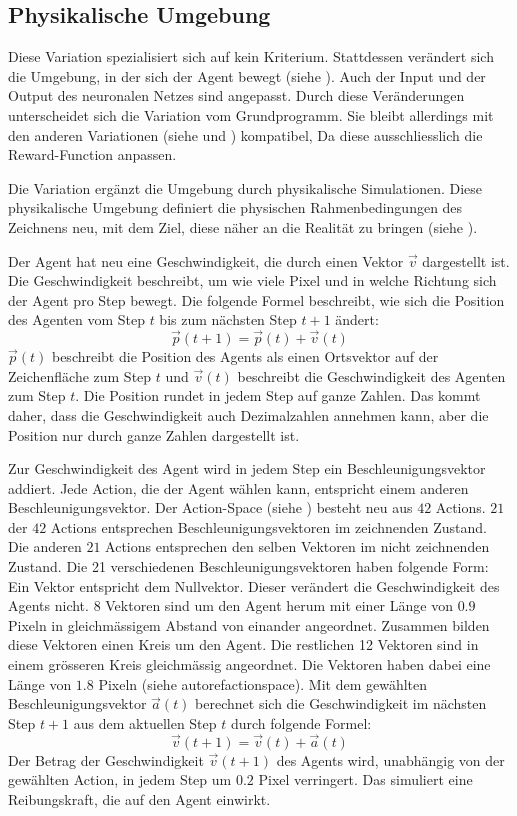 \subsection{Physikalische Umgebung}\label{sub:m_var_phy}
Diese Variation spezialisiert sich auf kein Kriterium. Stattdessen verändert
sich die Umgebung, in der sich der Agent bewegt (siehe ).
Auch der Input und der Output des neuronalen Netzes sind angepasst. Durch diese
Veränderungen unterscheidet sich die Variation vom Grundprogramm. Sie bleibt
allerdings mit den anderen Variationen (siehe  und
) kompatibel, Da diese ausschliesslich die
Reward-Function anpassen.

Die Variation ergänzt die Umgebung durch physikalische Simulationen. Diese
physikalische Umgebung definiert die physischen Rahmenbedingungen des Zeichnens
neu, mit dem Ziel, diese näher an die Realität zu bringen (siehe
). 

Der Agent hat neu eine Geschwindigkeit, die durch einen Vektor $\vec{v}$
dargestellt ist. Die Geschwindigkeit beschreibt, um wie viele Pixel und in
welche Richtung sich der Agent pro Step bewegt. Die folgende Formel beschreibt,
wie sich die Position des Agenten vom Step $t$ bis zum nächsten Step $t+1$
ändert:
\[ \vec{p}(t+1) = \vec{p}(t) + \vec{v}(t) \] 
$\vec{p}(t)$ beschreibt die Position des Agents als einen Ortsvektor auf der
Zeichenfläche zum Step $t$ und $\vec{v}(t)$ beschreibt die Geschwindigkeit des
Agenten zum Step $t$. Die Position rundet in jedem Step auf ganze Zahlen. Das
kommt daher, dass die Geschwindigkeit auch Dezimalzahlen annehmen kann, aber die
Position nur durch ganze Zahlen dargestellt ist.

Zur Geschwindigkeit des Agent wird in jedem Step ein Beschleunigungsvektor
addiert. Jede Action, die der Agent wählen kann, entspricht einem anderen
Beschleunigungsvektor. Der Action-Space (siehe ) besteht
neu aus $42$ Actions. $21$ der $42$ Actions entsprechen Beschleunigungsvektoren
im zeichnenden Zustand. Die anderen $21$ Actions entsprechen den selben Vektoren
im nicht zeichnenden Zustand. Die 21 verschiedenen Beschleunigungsvektoren haben
folgende Form: Ein Vektor entspricht dem Nullvektor. Dieser verändert die
Geschwindigkeit des Agents nicht. $8$ Vektoren sind um den Agent herum mit
einer Länge von $0.9$ Pixeln in gleichmässigem Abstand von einander angeordnet. %
Zusammen bilden diese Vektoren einen Kreis um den Agent. Die restlichen 12
Vektoren sind in einem grösseren Kreis gleichmässig angeordnet. Die Vektoren
haben dabei eine Länge von $1.8$ Pixeln (siehe autoref{actionspace}).  Mit dem  %
gewählten Beschleunigungsvektor $\vec{a}(t)$ berechnet sich die Geschwindigkeit
im nächsten Step $t+1$ aus dem aktuellen Step $t$ durch folgende Formel:
\[ \vec{v}(t+1) = \vec{v}(t) + \vec{a}(t) \] 
Der Betrag der Geschwindigkeit $\vec{v}(t+1)$ des Agents wird, unabhängig von
der gewählten Action, in jedem Step um $0.2$ Pixel verringert. Das simuliert eine  %
Reibungskraft, die auf den Agent einwirkt.

